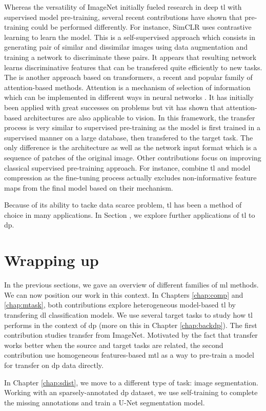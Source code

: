 Whereas the versatility of ImageNet initially fueled research in deep \acrlong{tl} with supervised model pre-training, several recent contributions have shown that pre-training could be performed differently. For instance, SimCLR \parencite{chen2020simple} uses contrastive learning to learn the model. This is a self-supervised approach which consists in generating pair of similar and dissimilar images using data augmentation and training a network to discriminate these pairs. It appears that resulting network learns discriminative features that can be transfered quite efficiently to new tasks. The  \parencite{dosovitskiy2020image} is another approach based on transformers, a recent and popular family of attention-based methods. Attention is a mechanism of selection of information which can be implemented in different ways in neural networks \parencite{niu2021review}. It has initially been applied with great successes on  problems but \acrshort{vit} has shown that attention-based architectures are also applicable to vision. In this framework, the transfer process is very similar to supervised pre-training as the model is first trained in a supervised manner on a large database, then transfered to the target task. The only difference is the architecture as well as the network input format which is a sequence of patches of the original image. Other contributions focus on improving classical supervised pre-training approach. For instance, \parencite{wang2019pay} combine \acrlong{tl} and model compression as the fine-tuning process actually excludes non-informative feature maps from the final model based on their  mechanism.

Because of its ability to tacke data scarce problem, \acrlong{tl} has been a method of choice in many applications. In Section , we explore further applications of \acrlong{tl} to \acrlong{dp}.

\section{Wrapping up}

In the previous sections, we gave an overview of different families of \acrlong{ml} methods. We can now position our work in this context. In Chapters \ref{chap:comp} and \ref{chap:mtask}, both contributions explore heterogeneous model-based \acrlong{tl} by transfering \acrlong{dl} classification models. We use several target tasks to study how \acrlong{tl} performs in the context of \acrlong{dp} (more on this in Chapter \ref{chap:backdp}). The first contribution studies transfer from ImageNet. Motivated by the fact that transfer works better when the source and target tasks are related, the second contribution use homogeneous features-based \acrlong{mtl} as a way to pre-train a model for transfer on \acrlong{dp} data directly.

In Chapter \ref{chap:sdist}, we move to a different type of task: image segmentation. Working with an sparsely-annotated \acrlong{dp} dataset, we use self-training to complete the missing annotations and train a U-Net segmentation model.


